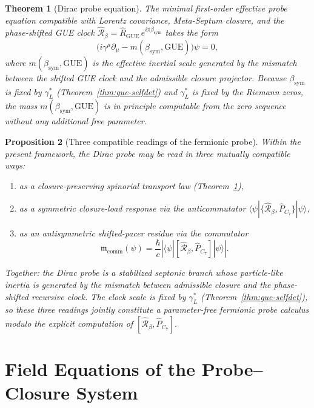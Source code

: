 \documentclass[12pt,a4paper]{article}
\newtheorem{theorem}{Theorem}[section]
\newtheorem{proposition}[theorem]{Proposition}
\newcommand{\bsym}{\beta_{\mathrm{sym}}}
\newcommand{\gL}{\gamma_L}
\begin{document}
\begin{theorem}[Dirac probe equation]\label{thm:dirac-probe}
The minimal first-order effective probe equation compatible with Lorentz
covariance, Meta-Septum closure, and the phase-shifted GUE clock
$\hat{\mathcal{R}}_\beta = \hat R_{\mathrm{GUE}}\,e^{i\pi\bsym}$
takes the form
\[
  \bigl(i\gamma^\mu\partial_\mu
        - m(\bsym,\mathrm{GUE})\bigr)\psi = 0,
\]
where $m(\bsym,\mathrm{GUE})$ is the effective inertial scale generated
by the mismatch between the shifted GUE clock and the admissible closure
projector.
Because $\bsym$ is fixed by $\gL^*$ (Theorem~\ref{thm:gue-selfdet}) and
$\gL^*$ is fixed by the Riemann zeros, the mass $m(\bsym,\mathrm{GUE})$
is in principle computable from the zero sequence without any additional
free parameter.
\end{theorem}

\begin{proposition}[Three compatible readings of the fermionic probe]
Within the present framework, the Dirac probe may be read in three
mutually compatible ways:
\begin{enumerate}[label=(\roman*)]
  \item as a closure-preserving spinorial transport law
        (Theorem~\ref{thm:dirac-probe}),
  \item as a symmetric closure-load response via the anticommutator
        $\langle\psi|\{\hat{\mathcal{R}}_\beta,\hat P_{C_7}\}|\psi\rangle$,
  \item as an antisymmetric shifted-pacer residue via the commutator
        \[
          \mathfrak{m}_{\mathrm{comm}}(\psi)
          = \frac{\hbar}{c}
            \left|\langle\psi|
            [\hat{\mathcal{R}}_\beta,\hat P_{C_7}]|\psi\rangle
            \right|.
        \]
\end{enumerate}
Together: the Dirac probe is a stabilized septonic branch whose
particle-like inertia is generated by the mismatch between admissible
closure and the phase-shifted recursive clock.
The clock scale is fixed by $\gL^*$ (Theorem~\ref{thm:gue-selfdet}),
so these three readings jointly constitute a parameter-free fermionic
probe calculus modulo the explicit computation of
$[\hat{\mathcal{R}}_\beta,\hat P_{C_7}]$.
\end{proposition}



\section{Field Equations of the Probe--Closure System}
\label{sec:field-eq}
\end{document}
